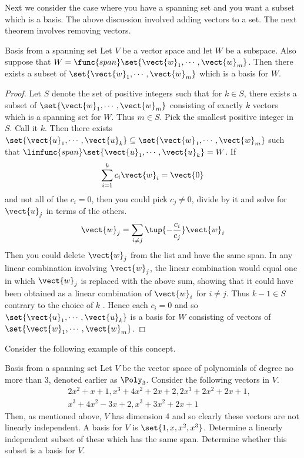 Next we consider the case where you have a
spanning set and you want a subset which is a basis. The above discussion involved adding vectors to a set. The next theorem involves removing vectors. 

\begin{theorem}{Basis from a spanning set}{}
Let $V$ be a vector space and let $W$ be a subspace. Also
suppose that $W=\func{span}\set{\vect{w}_{1},\cdots ,\vect{w}
_{m}}$. Then there exists a subset of $\set{\vect{w}_{1},\cdots ,
\vect{w}_{m}} $ which is a basis for $W$.
\end{theorem}

\begin{proof}
Let $S$ denote the set of positive integers such that for $
k\in S$, there exists a subset of $\set{\vect{w}_{1},\cdots ,\vect{w}
_{m}} $ consisting of exactly $k$ vectors which is a spanning set for 
$W$. Thus $m\in S$. Pick the smallest positive integer in $S$. Call it $k$.
Then there exists $\set{\vect{u}_{1},\cdots ,\vect{u}_{k}} \subseteq
\set{\vect{w}_{1},\cdots ,\vect{w}_{m}} $ such that $\limfunc{span}
\set{\vect{u}_{1},\cdots ,\vect{u}_{k}} =W$. If 
\begin{equation*}
\sum_{i=1}^{k}c_{i}\vect{w}_{i}=\vect{0}
\end{equation*}
and not all of the $c_{i}=0$, then you could pick $c_{j}\neq 0$, divide by
it and solve for $\vect{u}_{j}$ in terms of the others. 
\begin{equation*}
\vect{w}_{j}=\sum_{i\neq j}\tup{-\frac{c_{i}}{c_{j}}} \vect{w}_{i}
\end{equation*}
Then you could delete $\vect{w}_{j}$ from the list and have the same span.
In any linear combination involving $\vect{w}_{j}$, the linear
combination would equal one in which $\vect{w}_{j}$ is replaced with the
above sum, showing that it could have been obtained as a linear combination
of $\vect{w}_{i}$ for $i\neq j$. Thus $k-1\in S$ contrary to the choice of $k$
. Hence each $c_{i}=0$ and so $\set{\vect{u}_{1},\cdots ,\vect{u}
_{k}} $ is a basis for $W$ consisting of vectors of $\set{\vect{w}
_{1},\cdots ,\vect{w}_{m}}$. 
\end{proof}

Consider the following example of this concept. 

\begin{example}{Basis from a spanning set}{}
Let $V$ be the vector space of polynomials of degree no more than 3,
denoted earlier as $\Poly_{3}$. Consider the following vectors in $V$.
\begin{eqnarray*}
&&2x^{2}+x+1,x^{3}+4x^{2}+2x+2,2x^{3}+2x^{2}+2x+1, \\
&&x^{3}+4x^{2}-3x+2,x^{3}+3x^{2}+2x+1
\end{eqnarray*}
Then, as mentioned above, $V$ has dimension 4 and so clearly these vectors
are not linearly independent. A basis for $V$ is $\set{
1,x,x^{2},x^{3}}$. Determine a linearly independent subset of these
which has the same span. Determine whether this subset is a basis for $V$.
\end{example}

